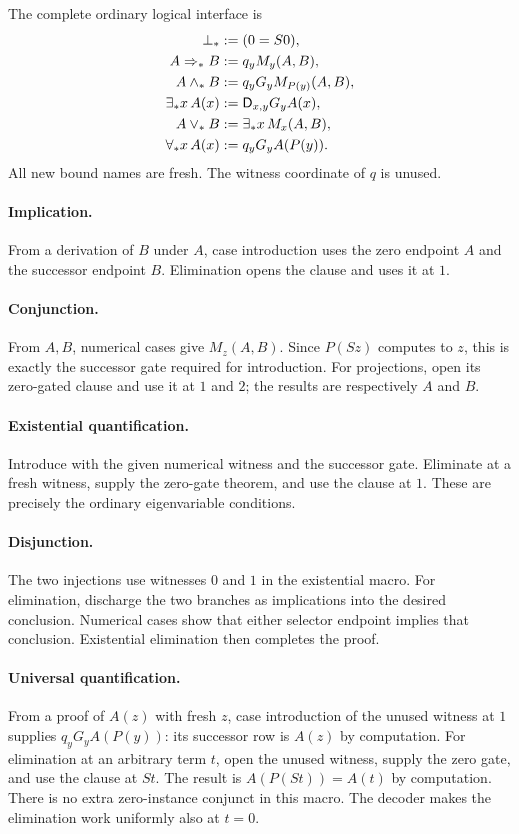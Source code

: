 \documentclass[11pt]{article}
\theoremstyle{definition}
\theoremstyle{remark}
\newcommand{\D}{\mathsf D}
\begin{document}
The complete ordinary logical interface is
\begin{align}
 \bot_*&:=(0=S0), \notag\\
 A\Rightarrow_*B&:=q_yM_y(A,B), \notag\\
 A\wedge_*B&:=q_yG_yM_{P(y)}(A,B), \notag\\
 \exists_*x\,A(x)&:=\D_{x,y}G_yA(x), \label{eq:macros}\\
 A\vee_*B&:=\exists_*x\,M_x(A,B), \notag\\
 \forall_*x\,A(x)&:=q_yG_yA(P(y)). \notag
\end{align}
All new bound names are fresh. The witness coordinate
of $q$ is unused.

\paragraph{Implication.}
From a derivation of $B$ under $A$, case introduction
uses the zero endpoint $A$ and the successor endpoint
$B$. Elimination opens the clause and uses it at $1$.

\paragraph{Conjunction.}
From $A,B$, numerical cases give $M_z(A,B)$.
Since $P(Sz)$ computes to $z$, this is exactly the
successor gate required for introduction.
For projections, open its zero-gated clause and use
it at $1$ and $2$; the results are respectively
$A$ and $B$.

\paragraph{Existential quantification.}
Introduce with the given numerical witness and the
successor gate. Eliminate at a fresh witness, supply
the zero-gate theorem, and use the clause at $1$.
These are precisely the ordinary eigenvariable
conditions.

\paragraph{Disjunction.}
The two injections use witnesses $0$ and $1$ in the
existential macro. For elimination, discharge the
two branches as implications into the desired
conclusion. Numerical cases show that either
selector endpoint implies that conclusion.
Existential elimination then completes the proof.

\paragraph{Universal quantification.}
From a proof of $A(z)$ with fresh $z$, case introduction
of the unused witness at $1$ supplies
$q_yG_yA(P(y))$: its successor row is $A(z)$
by computation. For elimination at an arbitrary
term $t$, open the unused witness, supply the zero
gate, and use the clause at $St$. The result is
$A(P(St))=A(t)$ by computation.
There is no extra zero-instance conjunct in this
macro. The decoder makes the elimination work
uniformly also at $t=0$.
\end{document}
